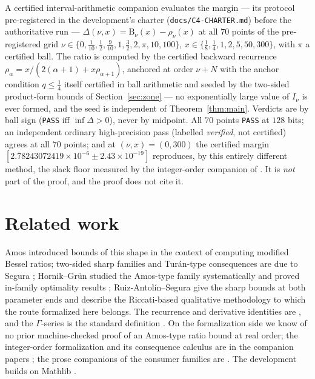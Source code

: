 \documentclass[11pt]{article}
\newcommand{\lean}[1]{\texttt{#1}}
\newcommand{\RHS}{\mathrm{B}}
\begin{document}
A certified interval-arithmetic companion evaluates the margin ---
its protocol pre-registered in the development's charter
(\lean{docs/C4-CHARTER.md}) before the authoritative run ---
$\Delta(\nu,x) = \RHS_\nu(x) - \rho_\nu(x)$ at all $70$ points of
the pre-registered grid
$\nu \in \{0, \tfrac1{10}, \tfrac12, \tfrac9{10}, 1, \tfrac32, 2,
\pi, 10, 100\}$,
$x \in \{\tfrac18, \tfrac14, 1, 2, 5, 50, 300\}$, with $\pi$ a
certified ball.  The ratio is computed by the certified backward
recurrence $\rho_\alpha = x/(2(\alpha+1) + x\rho_{\alpha+1})$,
anchored at order $\nu+N$ with the anchor condition
$q \le \tfrac14$ itself certified in ball arithmetic and seeded by
the two-sided product-form bounds of Section~\ref{sec:zone} --- no
exponentially large value of $I_\nu$ is ever formed, and the seed is
independent of Theorem~\ref{thm:main}.  Verdicts are by ball sign
(\lean{PASS} iff $\inf \Delta > 0$), never by midpoint.  All $70$
points \lean{PASS} at $128$ bits; an independent ordinary
high-precision pass (labelled \emph{verified}, not certified) agrees
at all $70$ points; and at $(\nu,x) = (0,300)$ the certified margin
$[2.78243072419\times10^{-6} \pm 2.43\times10^{-19}]$ reproduces,
by this entirely different method, the slack floor measured by the
integer-order companion of \cite{ErikssonC2}.  It is \emph{not}
part of the proof, and the proof does not cite it.

\section{Related work}\label{sec:related}

Amos \cite{Amos74} introduced bounds of this shape in the context of
computing modified Bessel ratios; two-sided sharp families and
Tur\'an-type consequences are due to Segura \cite{Segura11};
Hornik--Gr\"un studied the Amos-type family systematically
\cite{HG13} and proved in-family optimality results \cite{HG24};
Ruiz-Antol\'in--Segura \cite{RS16} give the sharp bounds at both
parameter ends and describe the Riccati-based qualitative
methodology to which the route formalized here belongs.  The
recurrence and derivative identities are \cite[10.29]{DLMF}, and the
$\Gamma$-series is the standard definition \cite[10.25.2]{DLMF}.  On
the formalization side we know of no prior machine-checked proof of
an Amos-type ratio bound at real order; the integer-order
formalization and its consequence calculus are in the companion
papers \cite{ErikssonC2,ErikssonC3}; the prose companions of the
consumer families are
\cite{ErikssonFH26,ErikssonVM26,ErikssonTuran26}.  The development
builds on Mathlib \cite{mathlib20}.
\end{document}
